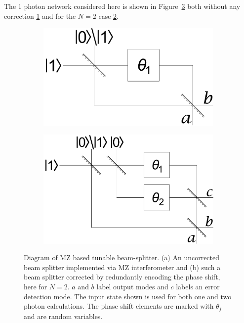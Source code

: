 \documentclass[aps,pra,twocolumn,superscriptaddress,numerical,floatfix]{revtex4-1}
\begin{document}
The 1 photon network considered here is shown in Figure~\ref{fig:MZ_setup} both without any correction \ref{fig:uncorrected MZ beam splitter} and for the $N=2$ case \ref{fig:corrected MZ beam splitter}.  
\begin{figure}[tbh]
	\begin{subfigure}[b]{0.8\columnwidth}
		\includegraphics[width=1\columnwidth]{beam_splitter_system_a.pdf}
		\caption{}
		\label{fig:uncorrected MZ beam splitter} 
	\end{subfigure}
	
	\begin{subfigure}[b]{0.9\columnwidth}
		\includegraphics[width=\columnwidth]{beam_splitter_system_b.pdf}
		\caption{}
		\label{fig:corrected MZ beam splitter}
	\end{subfigure}
			\caption{\label{fig:MZ_setup}Diagram of MZ based tunable beam-splitter. (a) An uncorrected beam splitter implemented via MZ interferometer and (b) such a beam splitter corrected by redundantly encoding the phase shift, here for $N=2$. $a$ and $b$ label output modes and $c$ labels an error detection mode. The input state shown is used for both one and two photon calculations. The phase shift elements are marked with $\theta_{j}$ and are random variables.}
\end{figure}
	
\end{document}
